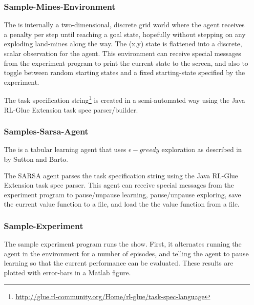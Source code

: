 \documentclass[11pt]{article}
\begin{document}
\subsubsection{Sample-Mines-Environment}
\label{mines-sample}
The 
is internally a two-dimensional, discrete grid world where the agent receives a penalty per step until reaching a goal state, hopefully without stepping on any exploding land-mines along the way.  The (x,y) state is flattened into a discrete, scalar observation for the agent.  This environment can receive special messages from the experiment program to print the current state to the screen, and also to toggle between random starting states and a fixed starting-state specified by the experiment.

The task specification string\footnote{\url{http://glue.rl-community.org/Home/rl-glue/task-spec-language}} is created in a semi-automated way using the Java RL-Glue Extension task spec parser/builder. 

\subsubsection{Samples-Sarsa-Agent}
\label{sarsa-sample}
The 
is a tabular learning agent that uses $\epsilon-greedy$ exploration as described in  by Sutton and Barto.

The SARSA agent parses the task specification string using the Java RL-Glue Extension task spec parser.  This agent can receive special messages from the experiment program to pause/unpause learning, pause/unpause exploring, save the current value function to a file, and load the the value function from a file.

\subsubsection{Sample-Experiment}
The sample experiment program runs the show.  First, it alternates running the agent in the environment for a number of episodes, and telling the agent to pause learning so that the current performance can be evaluated.  These results are plotted with error-bars in a Matlab figure.
\end{document}
